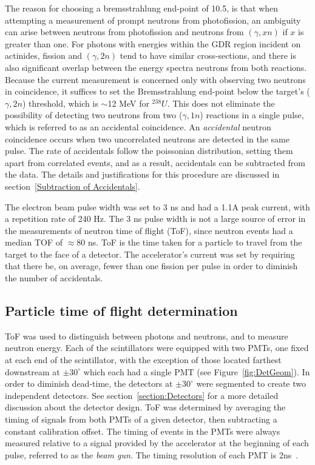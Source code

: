 The reason for choosing a bremsstrahlung end-point of 10.5, is that when attempting a measurement of prompt neutrons from photofission, an ambiguity can arise between neutrons from photofission and neutrons from $(\gamma, xn)$ if $x$ is greater than one.
For photons with energies within the GDR region incident on actinides, fission and $(\gamma, 2n)$ tend to have similar cross-sections, and there is also significant overlap between the energy spectra neutrons from both reactions.
Because the current measurement is concerned only with observing two neutrons in coincidence, it suffices to set the Bremsstrahlung end-point below the target's ($\gamma, 2n$) threshold, which is $\sim$12 MeV for $^{238}U$.
This does not eliminate the possibility of detecting two neutrons from  two ($\gamma, 1n$) reactions in a single pulse, which is referred to as an accidental coincidence.
An \textit{accidental} neutron coincidence occurs when two uncorrelated neutrons are detected in the same pulse.
The rate of accidentals follow the poissonian distribution, setting them apart from correlated events, and as a result, accidentals can be subtracted from the data.
The details and justifications for this procedure are discussed in section~\ref{Subtraction of Accidentals}.

The electron beam pulse width was set to 3 ns and had a 1.1A peak current, with a repetition rate of 240 Hz.
The 3 ns pulse width is not a large source of error in the measurements of neutron time of flight (ToF), since neutron events had a median TOF of $\approx$80 ns.
ToF is the time taken for a particle to travel from the target to the face of a detector.
The accelerator's current was set by requiring that there be, on average, fewer than one fission per pulse in order to diminish the number of accidentals.

\subsection{Particle time of flight determination}
\label{reconstruction}
ToF was used to distinguish between photons and neutrons, and to measure neutron energy.
Each of the scintillators were equipped with two PMTs, one fixed at each end of the scintillator, with the exception of those located farthest downstream at $\pm30^{\circ}$ which each had a single PMT (see Figure~\ref{fig:DetGeom}).
In order to diminish dead-time, the detectors at $\pm30^{\circ}$ were segmented to create two independent detectors.
See section~\ref{section:Detectors} for a more detailed discussion about the detector design.
ToF was determined by averaging the timing of signals from both PMTs of a given detector, then subtracting a constant calibration offset.
The timing of events in the PMTs were always measured relative to a signal provided by the accelerator at the beginning of each pulse, referred to as the \textit{beam gun}.
The timing resolution of each PMT is 2ns~\cite{PMT}.

